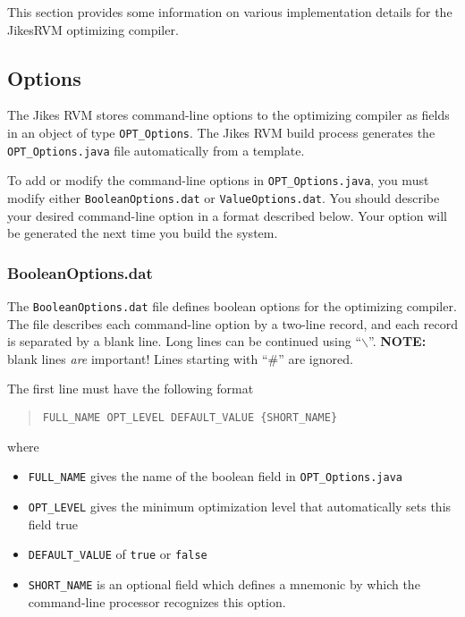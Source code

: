 This section provides some information on various
implementation details for the Jikes\trademark RVM optimizing compiler.

\subsection{Options}
\label{section:optdetails:options}

The Jikes RVM stores command-line options to the optimizing compiler 
as fields in an object of type {\tt OPT\_Options}.
The Jikes RVM build process generates the {\tt OPT\_Options.java} 
file automatically from a template.  

To add or modify the command-line options in {\tt OPT\_Options.java},
you must modify either {\tt BooleanOptions.dat} or 
{\tt ValueOptions.dat}.  You should describe your desired
command-line option in a format described below.
Your option will be generated the next time you build the
system.

\JikesTMFooter

\subsubsection{BooleanOptions.dat}

The {\tt BooleanOptions.dat} file defines boolean options for
the optimizing compiler.  The file describes each command-line option 
by a two-line record, and each record is separated
by a blank line.  Long lines can be continued using ``$\backslash$''.
{\bf NOTE:} blank lines {\em are} important!
Lines starting with ``\#'' are ignored.

The first line must have the following format
\begin{quote}
\begin{verbatim}
FULL_NAME OPT_LEVEL DEFAULT_VALUE {SHORT_NAME}
\end{verbatim}
\end{quote}
where
\begin{itemize}
\item {\tt FULL\_NAME} gives the name of the boolean field in {\tt OPT\_Options.java}
\item {\tt OPT\_LEVEL} gives the minimum optimization level that automatically sets this field true
\item {\tt DEFAULT\_VALUE} of {\tt true} or {\tt false}
\item {\tt SHORT\_NAME} is an optional field which defines a mnemonic by which the command-line processor recognizes this option.
\end{itemize}

